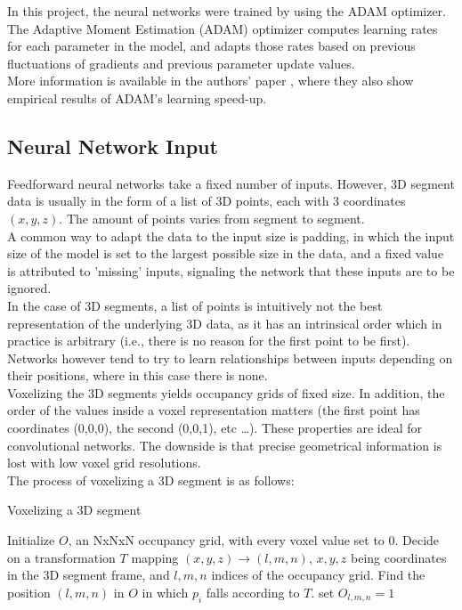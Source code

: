 In this project, the neural networks were trained by using the ADAM optimizer. The Adaptive Moment Estimation (ADAM) optimizer computes learning rates for each parameter in the model, and adapts those rates based on previous fluctuations of gradients and previous parameter update values.\\

More information is available in the authors' paper \cite{adam}, where they also show empirical results of ADAM's learning speed-up. 

\subsection{Neural Network Input}
\label{subsec:NNinput}

Feedforward neural networks take a fixed number of inputs. However, 3D segment data is usually in the form of a list of 3D points, each with 3 coordinates $(x,y,z)$. The amount of points varies from segment to segment.\\

A common way to adapt the data to the input size is padding, in which the input size of the model is set to the largest possible size in the data, and a fixed value is attributed to 'missing' inputs, signaling the network that these inputs are to be ignored.\\

In the case of 3D segments, a list of points is intuitively not the best representation of the underlying 3D data, as it has an intrinsical order which in practice is arbitrary (i.e., there is no reason for the first point to be first). Networks however tend to try to learn relationships between inputs depending on their positions, where in this case there is none.\\

Voxelizing the 3D segments yields occupancy grids of fixed size. In addition, the order of the values inside a voxel representation matters (the first point has coordinates (0,0,0), the second (0,0,1), etc \ldots). These properties are ideal for convolutional networks. The downside is that precise geometrical information is lost with low voxel grid resolutions.\\

The process of voxelizing a 3D segment is as follows:

\begin{algorithm}
  \caption{Voxelizing a 3D segment}
  \begin{algorithmic}[1]
    \State Initialize $O$, an NxNxN occupancy grid, with every voxel value set to 0.
    \State Decide on a transformation $T$ mapping $(x,y,z) \to (l,m,n)$, $x,y,z$ being coordinates in the 3D segment frame, and $l,m,n$ indices of the occupancy grid.
    \State Find the position $(l,m,n)$ in $O$ in which $p_i$ falls according to $T$.
     \State set $O_{l,m,n} = 1$
    \EndIf
    \EndFor
  \end{algorithmic}
\end{algorithm}


